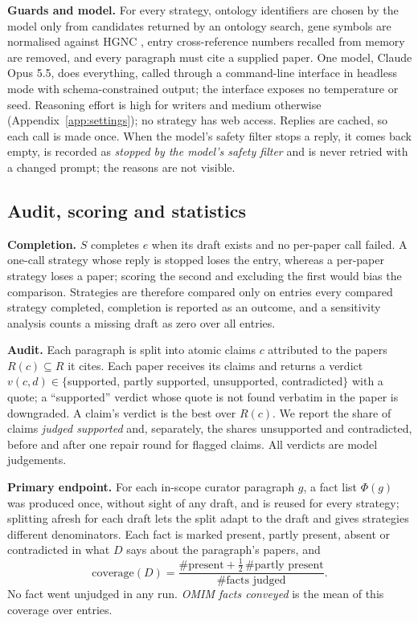 \documentclass{article} %
\begin{document}
\textbf{Guards and model.} For every strategy, ontology identifiers are chosen by the model only from candidates returned by an ontology search, gene symbols are normalised against HGNC \citep{seal2023genenames}, entry cross-reference numbers recalled from memory are removed, and every paragraph must cite a supplied paper. One model, Claude Opus 5.5, does everything, called through a command-line interface in headless mode with schema-constrained output; the interface exposes no temperature or seed. Reasoning effort is high for writers and medium otherwise (Appendix~\ref{app:settings}); no strategy has web access. Replies are cached, so each call is made once. When the model's safety filter stops a reply, it comes back empty, is recorded as \emph{stopped by the model's safety filter} and is never retried with a changed prompt; the reasons are not visible.

\subsection{Audit, scoring and statistics}
\label{sec:scoring}
\textbf{Completion.} $S$ completes $e$ when its draft exists and no per-paper call failed. A one-call strategy whose reply is stopped loses the entry, whereas a per-paper strategy loses a paper; scoring the second and excluding the first would bias the comparison. Strategies are therefore compared only on entries every compared strategy completed, completion is reported as an outcome, and a sensitivity analysis counts a missing draft as zero over all entries.

\textbf{Audit.} Each paragraph is split into atomic claims $c$ attributed to the papers $R(c)\subseteq R$ it cites. Each paper receives its claims and returns a verdict $v(c,d)\in\{$supported, partly supported, unsupported, contradicted$\}$ with a quote; a ``supported'' verdict whose quote is not found verbatim in the paper is downgraded. A claim's verdict is the best over $R(c)$. We report the share of claims \emph{judged supported} and, separately, the shares unsupported and contradicted, before and after one repair round for flagged claims. All verdicts are model judgements.

\textbf{Primary endpoint.} For each in-scope curator paragraph $g$, a fact list $\Phi(g)$ was produced once, without sight of any draft, and is reused for every strategy; splitting afresh for each draft lets the split adapt to the draft and gives strategies different denominators. Each fact is marked present, partly present, absent or contradicted in what $D$ says about the paragraph's papers, and
\begin{equation}
\text{coverage}(D)=\frac{\#\text{present}+\tfrac12\,\#\text{partly present}}{\#\text{facts judged}} .
\end{equation}
No fact went unjudged in any run. \emph{OMIM facts conveyed} is the mean of this coverage over entries.
\end{document}

